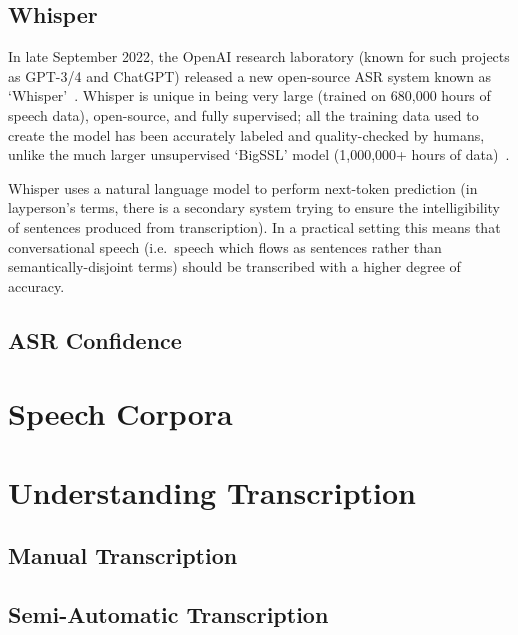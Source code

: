 \subsection{Whisper}

In late September 2022, the OpenAI research laboratory (known for such projects as GPT-3/4 and ChatGPT) released a new open-source ASR system known as `Whisper'~\cite{whisper}.
Whisper is unique in being very large (trained on 680,000 hours of speech data), open-source, and fully supervised;
all the training data used to create the model has been accurately labeled and
quality-checked by humans, unlike the much larger unsupervised `BigSSL' model (1,000,000+ hours of data)~\cite{bigssl}.

Whisper uses a natural language model to perform next-token prediction (in layperson's terms, there is a secondary system trying to ensure the intelligibility of sentences produced from transcription).
In a practical setting this means that conversational speech (i.e.\ speech which flows as sentences rather than semantically-disjoint terms) should be transcribed with a higher degree of accuracy.

\subsection{ASR Confidence}

\section{Speech Corpora}\label{sec:}

\section{Understanding Transcription}\label{sec:transcription}

\subsection{Manual Transcription}\label{subsec:manual-transcription}

\subsection{Semi-Automatic Transcription}\label{subsec:semi-auto-transcription}

